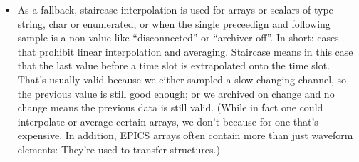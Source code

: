 \begin{itemize}
\item As a fallback, staircase interpolation is used for arrays or
  scalars of type string, char or enumerated, or when the single
  preceedign and following sample is a non-value like ``disconnected''
  or ``archiver off''. In short: cases that prohibit linear
  interpolation and averaging.  Staircase means in this case that the
  last value before a time slot is extrapolated onto the time slot.
  That's usually valid because we either sampled a slow changing
  channel, so the previous value is still good enough; or we archived
  on change and no change means the previous data is still valid.
  (While in fact one could interpolate or average certain arrays, we
  don't because for one that's expensive. In addition, EPICS arrays
  often contain more than just waveform elements: They're
  used to transfer structures.)
\end{itemize}

